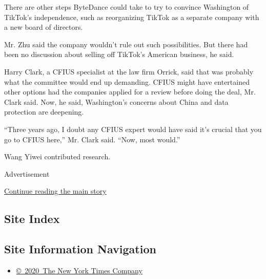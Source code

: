 There are other steps ByteDance could take to try to convince Washington
of TikTok's independence, such as reorganizing TikTok as a separate
company with a new board of directors.

Mr. Zhu said the company wouldn't rule out such possibilities. But there
had been no discussion about selling off TikTok's American business, he
said.

Harry Clark, a CFIUS specialist at the law firm Orrick, said that was
probably what the committee would end up demanding. CFIUS might have
entertained other options had the companies applied for a review before
doing the deal, Mr. Clark said. Now, he said, Washington's concerns
about China and data protection are deepening.

``Three years ago, I doubt any CFIUS expert would have said it's crucial
that you go to CFIUS here,'' Mr. Clark said. ``Now, most would.''

Wang Yiwei contributed research.

Advertisement

\protect\hyperlink{after-bottom}{Continue reading the main story}

\hypertarget{site-index}{%
\subsection{Site Index}\label{site-index}}

\hypertarget{site-information-navigation}{%
\subsection{Site Information
Navigation}\label{site-information-navigation}}

\begin{itemize}
\tightlist
\item
  \href{https://help.nytimes.com/hc/en-us/articles/115014792127-Copyright-notice}{©~2020~The
  New York Times Company}
\end{itemize}

